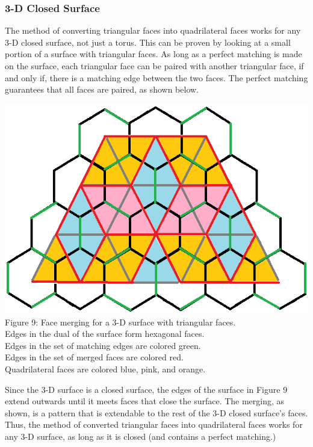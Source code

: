 \documentclass[12pt]{article}
\begin{document}
\begin{flushleft}
\subsubsection*{3-D Closed Surface}
The method of converting triangular faces into quadrilateral faces works for any 3-D closed surface, not just a torus. This can be proven by looking at a small portion of a surface with triangular faces. As long as a perfect matching is made on the surface, each triangular face can be paired with another triangular face, if and only if, there is a matching edge between the two faces. The perfect matching guarantees that all faces are paired, as shown below.

\begin{center}
\includegraphics[scale=0.8]{images/3dmerging.png}\\
Figure 9: Face merging for a 3-D surface with triangular faces.\\
Edges in the dual of the surface form hexagonal faces.\\
Edges in the set of matching edges are colored green.\\
Edges in the set of merged faces are colored red.\\
Quadrilateral faces are colored blue, pink, and orange.
\end{center}

Since the 3-D surface is a closed surface, the edges of the surface in Figure 9 extend outwards until it meets faces that close the surface. The merging, as shown, is a pattern that is extendable to the rest of the 3-D closed surface's faces. Thus, the method of converted triangular faces into quadrilateral faces works for any 3-D surface, as long as it is closed (and contains a perfect matching.)


\end{flushleft}
\end{document}
